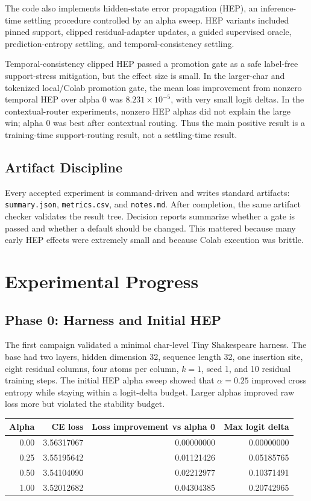 \documentclass[11pt]{article}
\begin{document}
The code also implements hidden-state error propagation (HEP), an
inference-time settling procedure controlled by an alpha sweep. HEP variants
included pinned support, clipped residual-adapter updates, a guided supervised
oracle, prediction-entropy settling, and temporal-consistency settling.

Temporal-consistency clipped HEP passed a promotion gate as a safe label-free
support-stress mitigation, but the effect size is small. In the larger-char and
tokenized local/Colab promotion gate, the mean loss improvement from nonzero
temporal HEP over alpha 0 was \(8.231\times 10^{-5}\), with very small logit
deltas. In the contextual-router experiments, nonzero HEP alphas did not
explain the large win; alpha 0 was best after contextual routing. Thus the main
positive result is a training-time support-routing result, not a settling-time
result.

\subsection{Artifact Discipline}

Every accepted experiment is command-driven and writes standard artifacts:
\texttt{summary.json}, \texttt{metrics.csv}, and \texttt{notes.md}. After
completion, the same artifact checker validates the result tree. Decision
reports summarize whether a gate is passed and whether a default should be
changed. This mattered because many early HEP effects were extremely small and
because Colab execution was brittle.

\section{Experimental Progress}

\subsection{Phase 0: Harness and Initial HEP}

The first campaign validated a minimal char-level Tiny Shakespeare harness.
The base had two layers, hidden dimension 32, sequence length 32, one
insertion site, eight residual columns, four atoms per column, \(k=1\), seed 1,
and 10 residual training steps. The initial HEP alpha sweep showed that
\(\alpha=0.25\) improved cross entropy while staying within a logit-delta
budget. Larger alphas improved raw loss more but violated the stability
budget.

\begin{center}
\begin{tabular}{rrrr}
\toprule
Alpha & CE loss & Loss improvement vs alpha 0 & Max logit delta \\
\midrule
0.00 & 3.56317067 & 0.00000000 & 0.00000000 \\
0.25 & 3.55195642 & 0.01121426 & 0.05185765 \\
0.50 & 3.54104090 & 0.02212977 & 0.10371491 \\
1.00 & 3.52012682 & 0.04304385 & 0.20742965 \\
\bottomrule
\end{tabular}
\end{center}
\end{document}
